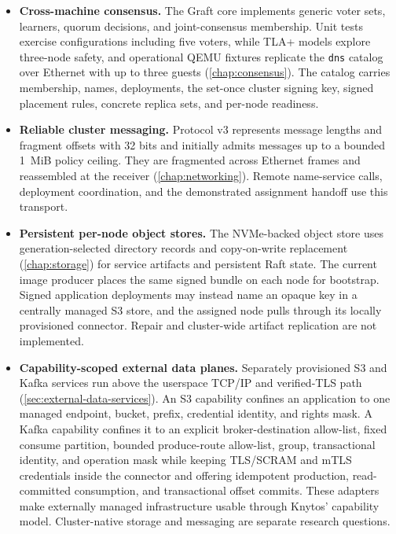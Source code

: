\begin{itemize}
    \item \textbf{Cross-machine consensus.} The Graft core implements generic
        voter sets, learners, quorum decisions, and joint-consensus membership.
        Unit tests exercise configurations including five voters, while TLA+ models
        explore three-node safety, and operational QEMU fixtures replicate the
        \texttt{dns} catalog over Ethernet with up to three guests
        (\autoref{chap:consensus}). The catalog carries membership, names,
        deployments, the set-once cluster signing key, signed placement rules,
        concrete replica sets, and per-node readiness.

    \item \textbf{Reliable cluster messaging.} Protocol v3 represents message
        lengths and fragment offsets with 32 bits and initially admits messages
        up to a bounded 1~MiB policy ceiling. They are fragmented across
        Ethernet frames and reassembled at the receiver
        (\autoref{chap:networking}). Remote name-service calls, deployment coordination,
        and the demonstrated assignment handoff use this transport.

    \item \textbf{Persistent per-node object stores.} The NVMe-backed object
        store uses generation-selected directory records and copy-on-write
        replacement (\autoref{chap:storage}) for service artifacts and persistent Raft
        state. The current image producer places the same signed bundle on
        each node for bootstrap. Signed application deployments may instead
        name an opaque key in a centrally managed S3 store, and the assigned node
        pulls through its locally provisioned connector. Repair and
        cluster-wide artifact replication are not implemented.

    \item \textbf{Capability-scoped external data planes.} Separately
        provisioned S3 and Kafka services run above the userspace TCP/IP and
        verified-TLS path (\autoref{sec:external-data-services}). An S3
        capability confines an application to one managed endpoint, bucket,
        prefix, credential identity, and rights mask. A Kafka capability
        confines it to an explicit broker-destination allow-list, fixed consume partition, bounded
        produce-route allow-list, group, transactional identity, and operation
        mask while keeping TLS/SCRAM and mTLS credentials inside the connector and offering idempotent production,
        read-committed consumption, and transactional offset commits. These
        adapters make externally managed infrastructure usable through
        Knytos' capability model. Cluster-native storage and messaging are
        separate research questions.


\end{itemize}

